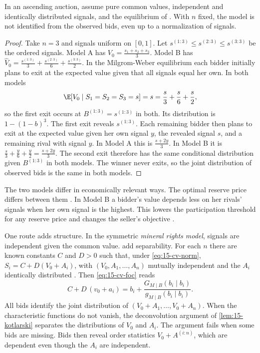 \begin{proposition}\label{prop:15-ah8}
In an ascending auction, assume pure common values, independent and identically distributed signals, and the
equilibrium of \citet{MilgromWeber1982}. With $n$ fixed, the model is not identified from the observed bids,
even up to a normalization of signals.
\end{proposition}

\begin{proof}
Take $n=3$ and signals uniform on $[0,1]$. Let $s^{(1:3)}\le s^{(2:3)}\le s^{(3:3)}$ be the ordered signals.
Model A has $V_0=\frac{s_1+s_2+s_3}{3}$. Model B has
$\hat V_0=\frac{s^{(1:3)}}{3}+\frac{s^{(2:3)}}{6}+\frac{s^{(3:3)}}{2}$. In the Milgrom-Weber equilibrium each
bidder initially plans to exit at the expected value given that all signals equal her own. In both models
\begin{equation*}
  \E[V_0\mid S_1=S_2=S_3=s]=s=\frac s3+\frac s6+\frac s2,
\end{equation*}
so the first exit occurs at $B^{(1:3)}=s^{(1:3)}$ in both. Its distribution is $1-(1-b)^3$. The first exit
reveals $s^{(1:3)}$. Each remaining bidder then plans to exit at the expected value given her own signal $y$, the
revealed signal $s$, and a remaining rival with signal $y$. In Model A this is $\frac{s+2y}{3}$. In Model B it
is $\frac s3+\frac y6+\frac y2=\frac{s+2y}{3}$. The second exit therefore has the same conditional distribution
given $B^{(1:3)}$ in both models. The winner never exits, so the joint distribution of observed bids is the
same in both models.
\end{proof}

The two models differ in economically relevant ways. The optimal reserve price differs between them
\citep[footnote~38]{AtheyHaile2002}. In Model B a bidder's value depends less on her rivals' signals when her
own signal is the highest. This lowers the participation threshold for any reserve price and changes the
seller's objective \citep[Section~7.1]{AtheyHaile2007}.

 One route adds structure. In the symmetric \emph{mineral rights
model}, signals are independent given the common value. \citet{LiPerrigneVuong2000} add separability. For each
$n$ there are known constants $C$ and $D>0$ such that, under \eqref{eq:15-cv-norm}, $S_i=C+D(V_0+A_i)$, with
$(V_0,A_1,\dots,A_n)$ mutually independent and the $A_i$ identically distributed
\citep[p.~2126]{AtheyHaile2002}. Then \eqref{eq:15-cv-foc} reads
\begin{equation*}
  C+D\,(v_0+a_i)=b_i+\frac{G_{M\mid B}(b_i\mid b_i)}{g_{M\mid B}(b_i\mid b_i)} .
\end{equation*}
All bids identify the joint distribution of $(V_0+A_1,\dots,V_0+A_n)$. When the characteristic functions do
not vanish, the deconvolution argument of \cref{lem:15-kotlarski} separates the distributions of $V_0$ and
$A_i$. The argument fails when some bids are missing. Bids then reveal order statistics $V_0+A^{(i:n)}$,
which are dependent even though the $A_i$ are independent.

